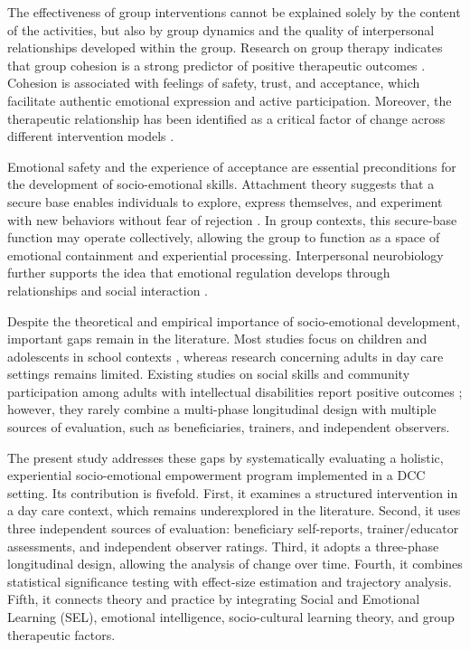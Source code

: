 \documentclass[journal]{IEEEtran}
\begin{document}
The effectiveness of group interventions cannot be explained solely by the content of the activities, but also by group dynamics and the quality of interpersonal relationships developed within the group. Research on group therapy indicates that group cohesion is a strong predictor of positive therapeutic outcomes \cite{burlingame2011}. Cohesion is associated with feelings of safety, trust, and acceptance, which facilitate authentic emotional expression and active participation. Moreover, the therapeutic relationship has been identified as a critical factor of change across different intervention models \cite{norcross2018,wampold2015}.

Emotional safety and the experience of acceptance are essential preconditions for the development of socio-emotional skills. Attachment theory suggests that a secure base enables individuals to explore, express themselves, and experiment with new behaviors without fear of rejection \cite{bowlby1988}. In group contexts, this secure-base function may operate collectively, allowing the group to function as a space of emotional containment and experiential processing. Interpersonal neurobiology further supports the idea that emotional regulation develops through relationships and social interaction \cite{siegel2012,schore2012}.

Despite the theoretical and empirical importance of socio-emotional development, important gaps remain in the literature. Most studies focus on children and adolescents in school contexts \cite{durlak2011,humphrey2013,oberle2019}, whereas research concerning adults in day care settings remains limited. Existing studies on social skills and community participation among adults with intellectual disabilities report positive outcomes \cite{hall2009,verdonschot2009}; however, they rarely combine a multi-phase longitudinal design with multiple sources of evaluation, such as beneficiaries, trainers, and independent observers.

The present study addresses these gaps by systematically evaluating a holistic, experiential socio-emotional empowerment program implemented in a DCC setting. Its contribution is fivefold. First, it examines a structured intervention in a day care context, which remains underexplored in the literature. Second, it uses three independent sources of evaluation: beneficiary self-reports, trainer/educator assessments, and independent observer ratings. Third, it adopts a three-phase longitudinal design, allowing the analysis of change over time. Fourth, it combines statistical significance testing with effect-size estimation and trajectory analysis. Fifth, it connects theory and practice by integrating Social and Emotional Learning (SEL), emotional intelligence, socio-cultural learning theory, and group therapeutic factors.
\end{document}
